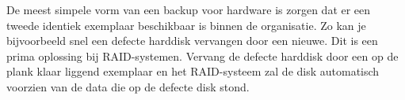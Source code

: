 De meest simpele vorm van een backup voor hardware is zorgen dat er een tweede identiek exemplaar beschikbaar is binnen de organisatie. Zo kan je bijvoorbeeld snel een defecte harddisk vervangen door een nieuwe. Dit is een prima oplossing bij RAID-systemen. Vervang de defecte harddisk door een op de plank klaar liggend exemplaar en het RAID-systeem zal de disk automatisch voorzien van de data die op de defecte disk stond.

